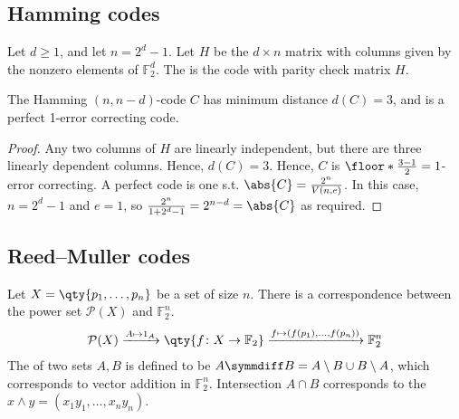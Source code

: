 \subsection{Hamming codes}
\begin{definition}
    Let $d \geq 1$, and let $n = 2^d - 1$.
    Let $H$ be the $d \times n$ matrix with columns given by the nonzero elements of $\mathbb F_2^d$.
    The  is the code with parity check matrix $H$.
\end{definition}
\begin{lemma}
    The Hamming $(n, n-d)$-code $C$ has minimum distance $d(C) = 3$, and is a perfect 1-error correcting code.
\end{lemma}
\begin{proof}
    Any two columns of $H$ are linearly independent, but there are three linearly dependent columns.
    Hence, $d(C) = 3$.
    Hence, $C$ is $\floor*{\frac{3-1}{2}} = 1$-error correcting.
    A perfect code is one s.t. $\abs{C} = \frac{2^n}{V(n,e)}$.
    In this case, $n = 2^d - 1$ and $e = 1$, so $\frac{2^n}{1 + 2^d - 1} = 2^{n-d} = \abs{C}$ as required.
\end{proof}

\subsection{Reed--Muller codes}
Let $X = \qty{p_1, \dots, p_n}$ be a set of size $n$.
There is a correspondence between the power set $\mathcal P(X)$ and $\mathbb F_2^n$.
\begin{align*}
    \mathcal P(X) \xrightarrow{A \mapsto 1_A} \qty{f \colon X \to \mathbb F_2} \xrightarrow{f \mapsto (f(p_1), \dots, f(p_n))} \mathbb F_2^n
\end{align*}
The  of two sets $A, B$ is defined to be $A \symmdiff B = A\setminus B \cup B \setminus A$, which corresponds to vector addition in $\mathbb F_2^n$.
Intersection $A \cap B$ corresponds to the  $x \wedge y = (x_1 y_1, \dots, x_n y_n)$.

